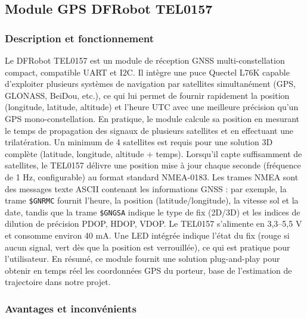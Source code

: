 \subsection{Module GPS DFRobot TEL0157}

\vspace{2em}

\subsubsection{Description et fonctionnement}

Le DFRobot TEL0157 est un module de réception GNSS multi-constellation compact, compatible UART et I2C.  
Il intègre une puce Quectel L76K capable d'exploiter plusieurs systèmes de navigation par satellites simultanément (GPS, GLONASS, BeiDou, etc.), ce qui lui permet de fournir rapidement la position (longitude, latitude, altitude) et l’heure UTC avec une meilleure précision qu'un GPS mono-constellation.  
En pratique, le module calcule sa position en mesurant le temps de propagation des signaux de plusieurs satellites et en effectuant une trilatération. Un minimum de 4 satellites est requis pour une solution 3D complète (latitude, longitude, altitude + temps).  
Lorsqu’il capte suffisamment de satellites, le TEL0157 délivre une position mise à jour chaque seconde (fréquence de 1 Hz, configurable) au format standard NMEA-0183.  
Les trames NMEA sont des messages texte ASCII contenant les informations GNSS : par exemple, la trame \texttt{\$GNRMC} fournit l’heure, la position (latitude/longitude), la vitesse sol et la date, tandis que la trame \texttt{\$GNGSA} indique le type de fix (2D/3D) et les indices de dilution de précision PDOP, HDOP, VDOP.  
Le TEL0157 s’alimente en 3,3–5,5 V et consomme environ 40 mA. Une LED intégrée indique l’état du fix (rouge si aucun signal, vert dès que la position est verrouillée), ce qui est pratique pour l’utilisateur.  
En résumé, ce module fournit une solution plug-and-play pour obtenir en temps réel les coordonnées GPS du porteur, base de l’estimation de trajectoire dans notre projet.

\vspace{2em}

\subsubsection{Avantages et inconvénients}

